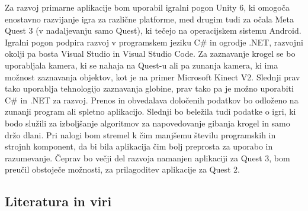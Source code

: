 \documentclass[a4paper, 12pt]{article}
\newcommand\cmnt[1]{\textcolor{munsell}{#1}}
\begin{document}
Za razvoj primarne aplikacije bom uporabil igralni pogon Unity 6, ki omogoča enostavno
razvijanje igra za različne platforme, med drugim tudi za očala Meta Quest 3 (v nadaljevanju samo Quest), ki tečejo na
operacijskem sistemu Android. Igralni pogon podpira razvoj v programskem jeziku C\# in
ogrodje .NET, razvojni okolji pa bosta Visual Studio in Visual Studio Code. Za zaznavanje krogel
se bo uporabljala kamera, ki se nahaja na Quest-u ali pa zunanja kamera, ki ima možnost
zaznavanja objektov, kot je na primer Microsoft Kinect V2. Slednji prav tako uporablja
tehnologijo zaznavanja globine, prav tako pa je možno uporabiti C\# in .NET za razvoj. Prenos in
obvedalava določenih podatkov bo odloženo na zunanji program ali spletno aplikacijo. Slednji bo beležila tudi
podatke o igri, ki bodo služili za izboljšanje algoritmov za napovedovanje gibanja krogel in samo držo dlani.
Pri nalogi bom stremel k čim manjšemu številu programskih in strojnh komponent, da bi bila aplikacija čim bolj preprosta za uporabo in razumevanje.
Čeprav bo večji del razvoja namanjen aplikaciji za Quest 3, bom preučil obstoječe možnosti, za prilagoditev aplikacije za 
Quest 2.
 \\

\subsection{Literatura in viri}
\label{literatura}


\renewcommand\refname{}
\vspace{-50px}




%
\end{document}
